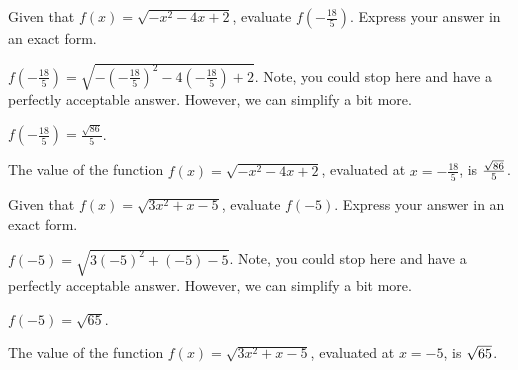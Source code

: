 \begin{shuffle}
\begin{exercise}
Given that $f(x)=\sqrt{-x^2-4 x+2}$, evaluate $f\left(-\frac{18}{5}\right)$. Express your answer in an exact form.
\begin{solution}
\begin{hint}
$f\left(-\frac{18}{5}\right)=\sqrt{-(-\frac{18}{5})^2-4 (-\frac{18}{5})+2}$. Note, you could stop here and have a perfectly acceptable answer. However, we can simplify a bit more. 
\end{hint}
\begin{hint}
$f\left(-\frac{18}{5}\right)=\frac{\sqrt{86}}{5}$.
\end{hint}
The value of the function $f(x) = \sqrt{-x^2-4 x+2}$, evaluated at $x=-\frac{18}{5}$, is ${\frac{\sqrt{86}}{5}}$.
\end{solution}
\end{exercise}

\begin{exercise}
Given that $f(x)=\sqrt{3 x^2+x-5}$, evaluate $f\left(-5\right)$. Express your answer in an exact form.
\begin{solution}
\begin{hint}
$f\left(-5\right)=\sqrt{3 (-5)^2+(-5)-5}$. Note, you could stop here and have a perfectly acceptable answer. However, we can simplify a bit more. 
\end{hint}
\begin{hint}
$f\left(-5\right)=\sqrt{65}$.
\end{hint}
The value of the function $f(x) = \sqrt{3 x^2+x-5}$, evaluated at $x=-5$, is ${\sqrt{65}}$.
\end{solution}
\end{exercise}
\end{shuffle}




